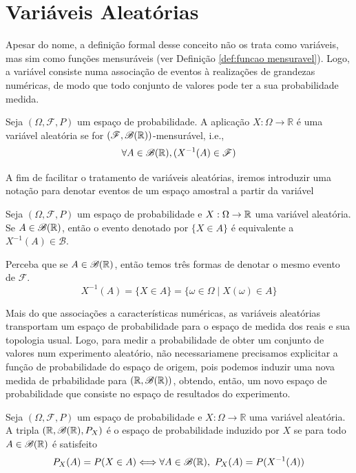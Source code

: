 \section{Variáveis Aleatórias}

Apesar do nome, a definição formal desse conceito não os trata como variáveis, mas
sim como funções mensuráveis (ver Definição \ref{def:funcao mensuravel}).
Logo, a variável consiste numa associação de eventos à realizações de
grandezas numéricas, de modo que todo conjunto de valores pode ter
a sua probabilidade medida.

\begin{def:va}
Seja $(\Omega, \mathcal{F}, P)$ um espaço de probabilidade.
A aplicação $X: \Omega \to \mathbb{R}$ é uma variável aleatória se for
$(\mathcal{F}, \mathcal{B}(\mathbb{R}))$-mensurável, i.e.,
\[
	\forall A \in \mathcal{B}(\mathbb{R}), (X^{-1}(A) \in \mathcal{F})
\]
\end{def:va}

A fim de facilitar o tratamento de variáveis aleatórias, iremos introduzir
uma notação para denotar eventos de um espaço amostral a partir da variável

\begin{def:evento va}
Seja $(\Omega, \mathcal{F}, P)$ um espaço de probabilidade e $X: \Omega \to \mathbb{R}$ uma
variável aleatória.
Se $A \in \mathcal{B}(\mathbb{R})$, então o evento denotado por $\{X \in A\}$ é equivalente a
$X^{-1}(A) \in \mathcal{B}$.
\end{def:evento va}

\noindent
Perceba que se $A \in \mathcal{B}(\mathbb{R})$, então temos três formas de denotar o mesmo evento de
$\mathcal{F}$.
\[
	X^{-1}(A) = \{X \in A\} = \{\omega \in \Omega \mid X(\omega) \in A\}
\]

Mais do que associações a características numéricas, as variáveis aleatórias
transportam um espaço de probabilidade para o espaço de medida dos reais e sua topologia
usual.
Logo, para medir a probabilidade de obter um conjunto de valores num experimento aleatório,
não necessariamene precisamos explicitar a função de probabilidade do espaço de origem,
pois podemos induzir uma nova medida de prbabilidade para $(\mathbb{R}, \mathcal{B}(\mathbb{R}))$, obtendo,
então, um novo espaço de probabilidade que consiste no espaço de resultados do experimento.

\begin{def:espaço induzido}
Seja $(\Omega, \mathcal{F}, P)$ um espaço de probabilidade e $X: \Omega \to \mathbb{R}$
uma variável aleatória.
A tripla $(\mathbb{R}, \mathcal{B}(\mathbb{R}), P_X)$ é o espaço de probabilidade induzido por $X$ se
para todo $A \in \mathcal{B}(\mathbb{R})$ é satisfeito
\[
	P_X(A) = P(X \in A) \Longleftrightarrow \forall A \in \mathcal{B}(\mathbb{R}),\ P_X(A) = P(X^{-1}(A))
\]
\end{def:espaço induzido}

